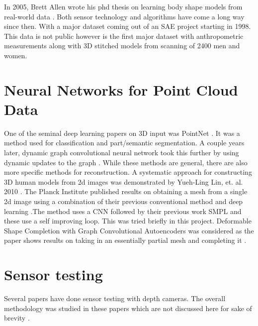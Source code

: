 In 2005, Brett Allen wrote his phd thesis on learning body shape models from real-world data \cite{allen2005learning}. Both sensor technology and algorithms have come a long way since then. With a major dataset coming out of an SAE project starting in 1998. This data is not public however is the first major dataset with anthropometric measurements along with 3D stitched models from scanning of 2400 men and women.

\section{Neural Networks for Point Cloud Data}
One of the seminal deep learning papers on 3D input was PointNet \cite{DBLP:journals/corr/QiSMG16}. It was a method used for classification and part/semantic segmentation. A couple years later, dynamic graph convolutional neural network took this further by using dynamic updates to the graph \cite{DBLP:journals/corr/abs-1801-07829}. While these methods are general, there are also more specific methods for reconstruction. A systematic approach for constructing 3D human models from 2d images was demonstrated by Yueh-Ling Lin, et. al. 2010 \cite{5645897}. The Planck Institute published results on obtaining a mesh from a single 2d image using a combination of their previous conventional method and deep learning \cite{kolotouros2019learning}.The method uses a CNN followed by their previous work SMPL and these use a self improving loop. This was tried briefly in this project. Deformable Shape Completion with Graph Convolutional Autoencoders was considered as the paper shows results on taking in an essentially partial mesh and completing it \cite{litany2018deformable}. 

\section{Sensor testing}
Several papers have done sensor testing with depth cameras. The overall methodology was studied in these papers which are not discussed here for sake of brevity\cite{sophian2017evaluation} \cite{khoshelham2012accuracy} \cite{langmann2012depth} \cite{sankowski2017estimation}.



